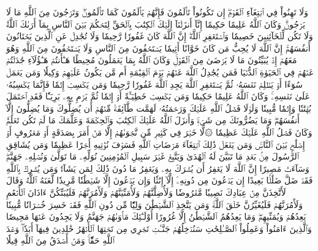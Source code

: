 وَلَا تَهِنُواْ فِي ٱبۡتِغَآءِ ٱلۡقَوۡمِۖ إِن تَكُونُواْ تَأۡلَمُونَ فَإِنَّهُمۡ يَأۡلَمُونَ كَمَا تَأۡلَمُونَۖ وَتَرۡجُونَ مِنَ ٱللَّهِ مَا لَا يَرۡجُونَۗ وَكَانَ ٱللَّهُ عَلِيمًا حَكِيمًا
إِنَّآ أَنزَلۡنَآ إِلَيۡكَ ٱلۡكِتَٰبَ بِٱلۡحَقِّ لِتَحۡكُمَ بَيۡنَ ٱلنَّاسِ بِمَآ أَرَىٰكَ ٱللَّهُۚ وَلَا تَكُن لِّلۡخَآئِنِينَ خَصِيمٗا
وَٱسۡتَغۡفِرِ ٱللَّهَۖ إِنَّ ٱللَّهَ كَانَ غَفُورٗا رَّحِيمٗا
وَلَا تُجَٰدِلۡ عَنِ ٱلَّذِينَ يَخۡتَانُونَ أَنفُسَهُمۡۚ إِنَّ ٱللَّهَ لَا يُحِبُّ مَن كَانَ خَوَّانًا أَثِيمٗا
يَسۡتَخۡفُونَ مِنَ ٱلنَّاسِ وَلَا يَسۡتَخۡفُونَ مِنَ ٱللَّهِ وَهُوَ مَعَهُمۡ إِذۡ يُبَيِّتُونَ مَا لَا يَرۡضَىٰ مِنَ ٱلۡقَوۡلِۚ وَكَانَ ٱللَّهُ بِمَا يَعۡمَلُونَ مُحِيطًا
هَـٰٓأَنتُمۡ هَـٰٓؤُلَآءِ جَٰدَلۡتُمۡ عَنۡهُمۡ فِي ٱلۡحَيَوٰةِ ٱلدُّنۡيَا فَمَن يُجَٰدِلُ ٱللَّهَ عَنۡهُمۡ يَوۡمَ ٱلۡقِيَٰمَةِ أَم مَّن يَكُونُ عَلَيۡهِمۡ وَكِيلٗا
وَمَن يَعۡمَلۡ سُوٓءًا أَوۡ يَظۡلِمۡ نَفۡسَهُۥ ثُمَّ يَسۡتَغۡفِرِ ٱللَّهَ يَجِدِ ٱللَّهَ غَفُورٗا رَّحِيمٗا
وَمَن يَكۡسِبۡ إِثۡمٗا فَإِنَّمَا يَكۡسِبُهُۥ عَلَىٰ نَفۡسِهِۦۚ وَكَانَ ٱللَّهُ عَلِيمًا حَكِيمٗا
وَمَن يَكۡسِبۡ خَطِيٓـَٔةً أَوۡ إِثۡمٗا ثُمَّ يَرۡمِ بِهِۦ بَرِيٓـٔٗا فَقَدِ ٱحۡتَمَلَ بُهۡتَٰنٗا وَإِثۡمٗا مُّبِينٗا
وَلَوۡلَا فَضۡلُ ٱللَّهِ عَلَيۡكَ وَرَحۡمَتُهُۥ لَهَمَّت طَّآئِفَةٞ مِّنۡهُمۡ أَن يُضِلُّوكَ وَمَا يُضِلُّونَ إِلَّآ أَنفُسَهُمۡۖ وَمَا يَضُرُّونَكَ مِن شَيۡءٖۚ وَأَنزَلَ ٱللَّهُ عَلَيۡكَ ٱلۡكِتَٰبَ وَٱلۡحِكۡمَةَ وَعَلَّمَكَ مَا لَمۡ تَكُن تَعۡلَمُۚ وَكَانَ فَضۡلُ ٱللَّهِ عَلَيۡكَ عَظِيمٗا
۞لَّا خَيۡرَ فِي كَثِيرٖ مِّن نَّجۡوَىٰهُمۡ إِلَّا مَنۡ أَمَرَ بِصَدَقَةٍ أَوۡ مَعۡرُوفٍ أَوۡ إِصۡلَٰحِۭ بَيۡنَ ٱلنَّاسِۚ وَمَن يَفۡعَلۡ ذَٰلِكَ ٱبۡتِغَآءَ مَرۡضَاتِ ٱللَّهِ فَسَوۡفَ نُؤۡتِيهِ أَجۡرًا عَظِيمٗا
وَمَن يُشَاقِقِ ٱلرَّسُولَ مِنۢ بَعۡدِ مَا تَبَيَّنَ لَهُ ٱلۡهُدَىٰ وَيَتَّبِعۡ غَيۡرَ سَبِيلِ ٱلۡمُؤۡمِنِينَ نُوَلِّهِۦ مَا تَوَلَّىٰ وَنُصۡلِهِۦ جَهَنَّمَۖ وَسَآءَتۡ مَصِيرًا
إِنَّ ٱللَّهَ لَا يَغۡفِرُ أَن يُشۡرَكَ بِهِۦ وَيَغۡفِرُ مَا دُونَ ذَٰلِكَ لِمَن يَشَآءُۚ وَمَن يُشۡرِكۡ بِٱللَّهِ فَقَدۡ ضَلَّ ضَلَٰلَۢا بَعِيدًا
إِن يَدۡعُونَ مِن دُونِهِۦٓ إِلَّآ إِنَٰثٗا وَإِن يَدۡعُونَ إِلَّا شَيۡطَٰنٗا مَّرِيدٗا
لَّعَنَهُ ٱللَّهُۘ وَقَالَ لَأَتَّخِذَنَّ مِنۡ عِبَادِكَ نَصِيبٗا مَّفۡرُوضٗا
وَلَأُضِلَّنَّهُمۡ وَلَأُمَنِّيَنَّهُمۡ وَلَأٓمُرَنَّهُمۡ فَلَيُبَتِّكُنَّ ءَاذَانَ ٱلۡأَنۡعَٰمِ وَلَأٓمُرَنَّهُمۡ فَلَيُغَيِّرُنَّ خَلۡقَ ٱللَّهِۚ وَمَن يَتَّخِذِ ٱلشَّيۡطَٰنَ وَلِيّٗا مِّن دُونِ ٱللَّهِ فَقَدۡ خَسِرَ خُسۡرَانٗا مُّبِينٗا
يَعِدُهُمۡ وَيُمَنِّيهِمۡۖ وَمَا يَعِدُهُمُ ٱلشَّيۡطَٰنُ إِلَّا غُرُورًا
أُوْلَـٰٓئِكَ مَأۡوَىٰهُمۡ جَهَنَّمُ وَلَا يَجِدُونَ عَنۡهَا مَحِيصٗا
وَٱلَّذِينَ ءَامَنُواْ وَعَمِلُواْ ٱلصَّـٰلِحَٰتِ سَنُدۡخِلُهُمۡ جَنَّـٰتٖ تَجۡرِي مِن تَحۡتِهَا ٱلۡأَنۡهَٰرُ خَٰلِدِينَ فِيهَآ أَبَدٗاۖ وَعۡدَ ٱللَّهِ حَقّٗاۚ وَمَنۡ أَصۡدَقُ مِنَ ٱللَّهِ قِيلٗا
